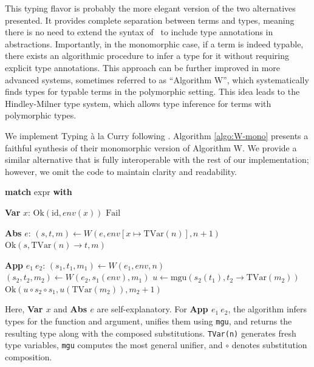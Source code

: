 This typing flavor is probably the more elegant version of the two alternatives presented. It provides complete separation between terms and types, meaning there is no need to extend the syntax of \lcalc \ to include type annotations in abstractions. Importantly, in the monomorphic case, if a term is indeed typable, there exists an algorithmic procedure to infer a type for it without requiring explicit type annotations. This approach can be further improved in more advanced systems, sometimes referred to as ``Algorithm W'', which systematically finds types for typable terms in the polymorphic setting. This idea leads to the Hindley-Milner type system, which allows type inference for terms with polymorphic types.

We implement Typing à la Curry following \cite{NazarethNipkow1996AlgorithmW}. Algorithm \ref{algo:W-mono} presents a faithful synthesis of their monomorphic version of Algorithm W. We provide a similar alternative that is fully interoperable with the rest of our implementation; however, we omit the code to maintain clarity and readability.

\begin{algorithm}
\caption{Monomorphic Algorithm W}
\label{algo:W-mono}
\begin{algorithmic}[1]
  \State \textbf{match} expr \textbf{with}
  
  \State \quad \textbf{Var} $x$:
  \State \Return $\text{Ok}(\text{id}, env(x))$
  \Else
  \State \Return $\text{Fail}$
  \EndIf

  \State \quad \textbf{Abs} $e$:
  \State $(s, t, m) \gets W(e, env[x \mapsto \text{TVar}(n)], n+1)$
  \State \Return $\text{Ok}(s, \text{TVar}(n) \to t, m)$

  \State \quad \textbf{App} $e_1~e_2$:
  \State $(s_1, t_1, m_1) \gets W(e_1, env, n)$
  \State $(s_2, t_2, m_2) \gets W(e_2, s_1(env), m_1)$
  \State $u \gets \text{mgu}(s_2(t_1), t_2 \to \text{TVar}(m_2))$
  \State \Return $\text{Ok}(u \circ s_2 \circ s_1, u(\text{TVar}(m_2)), m_2+1)$
  \EndFunction
\end{algorithmic}
\end{algorithm}

Here, \textbf{Var $x$} and \textbf{Abs $e$} are self-explanatory. For \textbf{App $e_1~e_2$}, the algorithm infers types for the function and argument, unifies them using \texttt{mgu}, and returns the resulting type along with the composed substitutions. \texttt{TVar(n)} generates fresh type variables, \texttt{mgu} computes the most general unifier, and $\circ$ denotes substitution composition.


